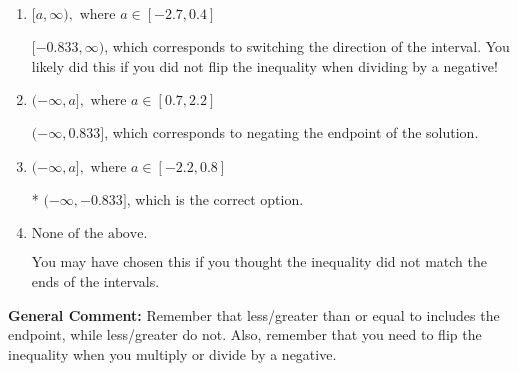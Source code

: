 \documentclass{extbook}[14pt]
\begin{document}
\begin{enumerate}
{\begin{enumerate}[label=\Alph*.]
 $[0.833, \infty)$, which corresponds to switching the direction of the interval AND negating the endpoint. You likely did this if you did not flip the inequality when dividing by a negative as well as not moving values over to a side properly.
\item \( [a, \infty), \text{ where } a \in [-2.7, 0.4] \)

 $[-0.833, \infty)$, which corresponds to switching the direction of the interval. You likely did this if you did not flip the inequality when dividing by a negative!
\item \( (-\infty, a], \text{ where } a \in [0.7, 2.2] \)

 $(-\infty, 0.833]$, which corresponds to negating the endpoint of the solution.
\item \( (-\infty, a], \text{ where } a \in [-2.2, 0.8] \)

* $(-\infty, -0.833]$, which is the correct option.
\item \( \text{None of the above}. \)

You may have chosen this if you thought the inequality did not match the ends of the intervals.
\end{enumerate}

\textbf{General Comment:} Remember that less/greater than or equal to includes the endpoint, while less/greater do not. Also, remember that you need to flip the inequality when you multiply or divide by a negative.
}
\end{enumerate}
\end{document}
